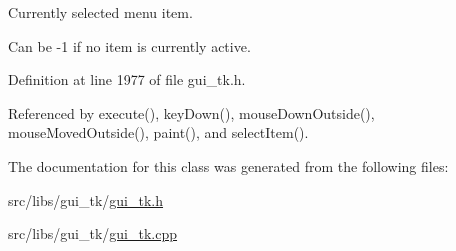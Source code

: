 Currently selected menu item. 

Can be -\/1 if no item is currently active. 

Definition at line 1977 of file gui\-\_\-tk.\-h.



Referenced by execute(), key\-Down(), mouse\-Down\-Outside(), mouse\-Moved\-Outside(), paint(), and select\-Item().



The documentation for this class was generated from the following files\-:\begin{DoxyCompactItemize}
\item 
src/libs/gui\-\_\-tk/\hyperlink{gui__tk_8h}{gui\-\_\-tk.\-h}\item 
src/libs/gui\-\_\-tk/\hyperlink{gui__tk_8cpp}{gui\-\_\-tk.\-cpp}\end{DoxyCompactItemize}
